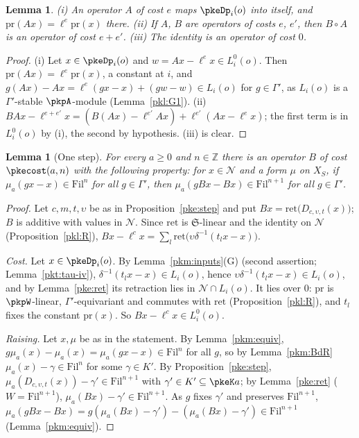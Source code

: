 \documentclass[10pt]{amsart}
\newtheorem{lemma}[theorem]{Lemma}
\theoremstyle{definition}
\theoremstyle{remark}
\newcommand{\Z}{\mathbb Z}
\begin{document}
\begin{lemma}\label{pke:op-basic}
(i) An operator $A$ of cost $e$ maps $\pkeDp_i(o)$ into itself, and $\mathrm{pr}(Ax)=\ell^e\mathrm{pr}(x)$
there. (ii) If $A$, $B$ are operators of costs $e$, $e'$, then $B\circ A$ is an operator of cost $e+e'$.
(iii) The identity is an operator of cost $0$.
\end{lemma}

\begin{proof}
(i) Let $x\in\pkeDp_i(o)$ and $w=Ax-\ell^ex\in L_i^0(o)$. Then $\mathrm{pr}(Ax)=\ell^e\mathrm{pr}(x)$, a constant
at $i$, and $g(Ax)-Ax=\ell^e(gx-x)+(gw-w)\in L_i(o)$ for $g\in\Gamma'$, as $L_i(o)$ is a $\Gamma'$-stable
$\pkpA$-module (Lemma~\ref{pkl:G1}). (ii) $BAx-\ell^{e+e'}x=(B(Ax)-\ell^{e'}Ax)+\ell^{e'}(Ax-\ell^ex)$; the
first term is in $L_i^0(o)$ by (i), the second by hypothesis. (iii) is clear.
\end{proof}

\begin{lemma}[One step]\label{pke:B}
For every $a\ge0$ and $n\in\Z$ there is an operator $B$ of cost $\pkecost(a,n)$ with the following property:
for $x\in\mathcal N$ and a form $\mu$ on $X_S$, if $\mu_a(gx-x)\in\mathrm{Fil}^n$ for all $g\in\Gamma'$, then
$\mu_a(gBx-Bx)\in\mathrm{Fil}^{n+1}$ for all $g\in\Gamma'$.
\end{lemma}

\begin{proof}
Let $c,m,t,\upsilon$ be as in Proposition~\ref{pke:step} and put $Bx=\mathrm{ret}\bigl(D_{c,\upsilon,t}(x)\bigr)$;
$B$ is additive with values in $\mathcal N$. Since $\mathrm{ret}$ is $\mathfrak S$-linear and the identity on
$\mathcal N$ (Proposition~\ref{pkl:R}), $Bx-\ell^cx=\sum_l\mathrm{ret}\bigl(\upsilon\delta^{-1}(t_lx-x)\bigr)$.

\emph{Cost.} Let $x\in\pkeDp_i(o)$. By Lemma~\ref{pkm:inputs}(G) (second assertion; Lemma~\ref{pkt:tau-iv}),
$\delta^{-1}(t_lx-x)\in L_i(o)$, hence $\upsilon\delta^{-1}(t_lx-x)\in L_i(o)$, and by Lemma~\ref{pke:ret} its
retraction lies in $\mathcal N\cap L_i(o)$. It lies over $0$: $\mathrm{pr}$ is $\pkpW$-linear,
$\Gamma'$-equivariant and commutes with $\mathrm{ret}$ (Proposition~\ref{pkl:R}), and $t_l$ fixes the constant
$\mathrm{pr}(x)$. So $Bx-\ell^cx\in L_i^0(o)$.

\emph{Raising.} Let $x,\mu$ be as in the statement. By Lemma~\ref{pkm:equiv}, $g\mu_a(x)-\mu_a(x)=\mu_a(gx-x)\in
\mathrm{Fil}^n$ for all $g$, so by Lemma~\ref{pkm:BdR} $\mu_a(x)-\gamma\in\mathrm{Fil}^n$ for some $\gamma\in K'$.
By Proposition~\ref{pke:step}, $\mu_a(D_{c,\upsilon,t}(x))-\gamma'\in\mathrm{Fil}^{n+1}$ with $\gamma'\in K'\subseteq
\pkeK a$; by Lemma~\ref{pke:ret} ($W=\mathrm{Fil}^{n+1}$), $\mu_a(Bx)-\gamma'\in\mathrm{Fil}^{n+1}$. As $g$ fixes
$\gamma'$ and preserves $\mathrm{Fil}^{n+1}$, $\mu_a(gBx-Bx)=g(\mu_a(Bx)-\gamma')-(\mu_a(Bx)-\gamma')\in
\mathrm{Fil}^{n+1}$ (Lemma~\ref{pkm:equiv}).
\end{proof}
\end{document}
